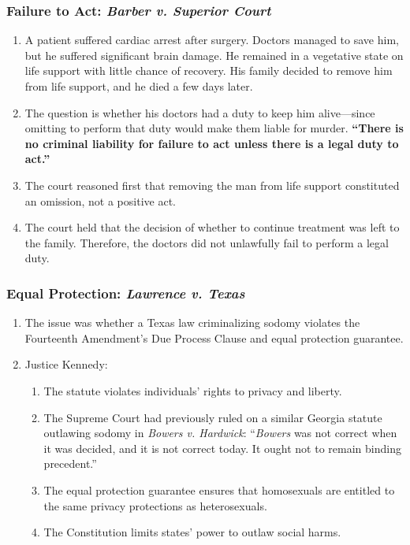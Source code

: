 \subsubsection{Failure to Act: \emph{Barber v. Superior Court}}

\begin{enumerate}
    \item A patient suffered cardiac arrest after surgery. Doctors managed to save him, but he suffered significant brain damage. He remained in a vegetative state on life support with little chance of recovery. His family decided to remove him from life support, and he died a few days later. 
    \item The question is whether his doctors had a duty to keep him alive---since omitting to perform that duty would make them liable for murder. \textbf{``There is no criminal liability for failure to act unless there is a legal duty to act.''} 
    \item The court reasoned first that removing the man from life support constituted an omission, not a positive act.
    \item The court held that the decision of whether to continue treatment was left to the family. Therefore, the doctors did not unlawfully fail to perform a legal duty.
\end{enumerate}

\subsubsection{Equal Protection: \emph{Lawrence v. Texas}}

\begin{enumerate}
    \item The issue was whether a Texas law criminalizing sodomy violates the Fourteenth Amendment's Due Process Clause and equal protection guarantee.
    \item Justice Kennedy:
    \begin{enumerate}
        \item The statute violates individuals' rights to privacy and liberty.
        \item The Supreme Court had previously ruled on a similar Georgia statute outlawing sodomy in \emph{Bowers v. Hardwick}: ``\emph{Bowers} was not correct when it was decided, and it is not correct today. It ought not to remain binding precedent.''
        \item The equal protection guarantee ensures that homosexuals are entitled to the same privacy protections as heterosexuals.
        \item The Constitution limits states' power to outlaw social harms.
    \end{enumerate}
\end{enumerate}

